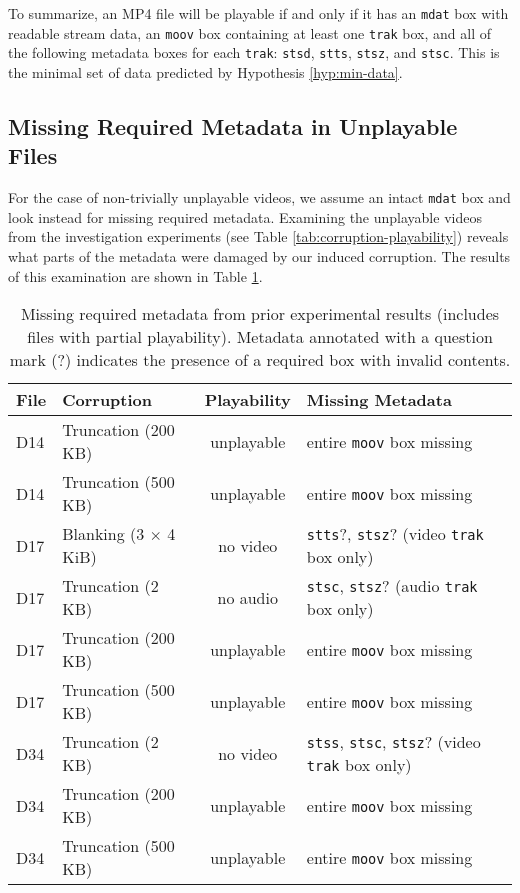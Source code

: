 To summarize, an MP4 file will be playable if and only if it has an \texttt{mdat} box with readable stream data, an \texttt{moov} box containing at least one \texttt{trak} box, and all of the following metadata boxes for each \texttt{trak}: \texttt{stsd}, \texttt{stts}, \texttt{stsz}, and \texttt{stsc}. This is the minimal set of data predicted by Hypothesis \ref{hyp:min-data}.

\subsection{Missing Required Metadata in Unplayable Files}

For the case of non-trivially unplayable videos, we assume an intact \texttt{mdat} box and look instead for missing required metadata. Examining the unplayable videos from the investigation experiments (see Table \ref{tab:corruption-playability}) reveals what parts of the metadata were damaged by our induced corruption. The results of this examination are shown in Table \ref{tab:missing-required-data}.

\begin{table}
    \centering
    \begin{tabular}{|l|l|c||l|}
        \hline
        \textbf{File} & \textbf{Corruption} & \textbf{Playability} & \textbf{Missing Metadata} \\
        \hline \hline
        D14 & Truncation (200 KB) & unplayable & entire \texttt{moov} box missing \\
        D14 & Truncation (500 KB) & unplayable & entire \texttt{moov} box missing \\
        \hline
        D17 & Blanking (3 \( \times \) 4 KiB) & no video & \texttt{stts}?, \texttt{stsz}? (video \texttt{trak} box only) \\
        D17 & Truncation (2 KB) & no audio & \texttt{stsc}, \texttt{stsz}? (audio \texttt{trak} box only) \\
        D17 & Truncation (200 KB) & unplayable & entire \texttt{moov} box missing \\
        D17 & Truncation (500 KB) & unplayable & entire \texttt{moov} box missing \\
        \hline
        D34 & Truncation (2 KB) & no video & \texttt{stss}, \texttt{stsc}, \texttt{stsz}? (video \texttt{trak} box only) \\
        D34 & Truncation (200 KB) & unplayable & entire \texttt{moov} box missing \\
        D34 & Truncation (500 KB) & unplayable & entire \texttt{moov} box missing \\
        \hline
    \end{tabular}
    \caption{Missing required metadata from prior experimental results (includes files with partial playability). Metadata annotated with a question mark (?) indicates the presence of a required box with invalid contents.}
    \label{tab:missing-required-data}
\end{table}

